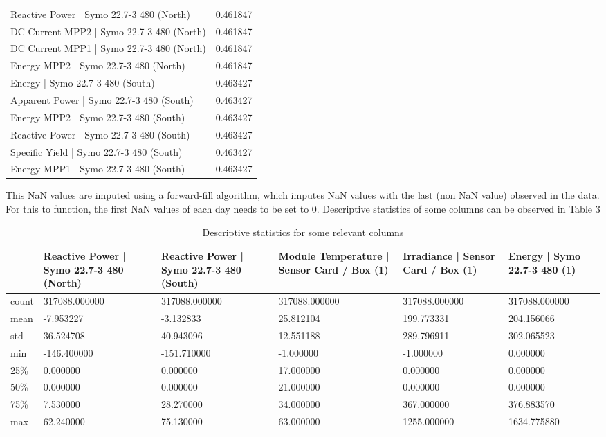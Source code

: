 \documentclass[a4paper,12pt]{article}
\begin{document}
\begin{table}[H]
\begin{tabular}{ll}
Reactive Power | Symo 22.7-3 480 (North) & 0.461847 \\
DC Current MPP2 | Symo 22.7-3 480 (North) & 0.461847 \\
DC Current MPP1 | Symo 22.7-3 480 (North) & 0.461847 \\
Energy MPP2 | Symo 22.7-3 480 (North) & 0.461847 \\
Energy | Symo 22.7-3 480 (South) & 0.463427 \\
Apparent Power | Symo 22.7-3 480 (South) & 0.463427 \\
Energy MPP2 | Symo 22.7-3 480 (South) & 0.463427 \\
Reactive Power | Symo 22.7-3 480 (South) & 0.463427 \\
Specific Yield | Symo 22.7-3 480 (South) & 0.463427 \\
Energy MPP1 | Symo 22.7-3 480 (South) & 0.463427 \\

\bottomrule
\end{tabular}
\label{tab:nan_percentages}
\end{table}

This NaN values are imputed using a forward-fill algorithm, which imputes NaN values with the last (non NaN value) observed in the data. For this to function, the first NaN values of each day needs to be set to 0. Descriptive statistics of some columns can be observed in Table 3

\begin{table}[H]
    \centering
    \caption{Descriptive statistics for some relevant columns}
    \begin{tabular}{l p{2.5cm} p{2.5cm} p{2.5cm} p{2.5cm} p{2.5cm}}
        \toprule
        & \textbf{Reactive Power | Symo 22.7-3 480 (North)} & \textbf{Reactive Power | Symo 22.7-3 480 (South)} & \textbf{Module Temperature | Sensor Card / Box (1)} & \textbf{Irradiance | Sensor Card / Box (1)} & \textbf{Energy | Symo 22.7-3 480 (1)} \\
        \midrule
        count & 317088.000000 & 317088.000000 & 317088.000000 & 317088.000000 & 317088.000000 \\
        mean & -7.953227 & -3.132833 & 25.812104 & 199.773331 & 204.156066 \\
        std & 36.524708 & 40.943096 & 12.551188 & 289.796911 & 302.065523 \\
        min & -146.400000 & -151.710000 & -1.000000 & -1.000000 & 0.000000 \\
        25\% & 0.000000 & 0.000000 & 17.000000 & 0.000000 & 0.000000 \\
        50\% & 0.000000 & 0.000000 & 21.000000 & 0.000000 & 0.000000 \\
        75\% & 7.530000 & 28.270000 & 34.000000 & 367.000000 & 376.883570 \\
        max & 62.240000 & 75.130000 & 63.000000 & 1255.000000 & 1634.775880 \\
        \bottomrule
    \end{tabular}
\end{table}
\end{document}
